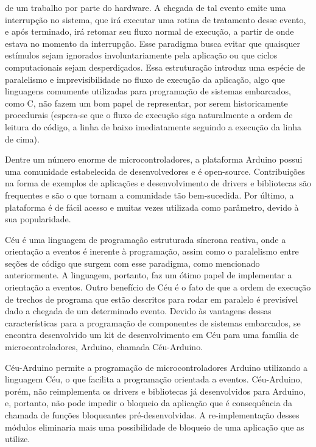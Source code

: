 \documentclass[11pt]{article}
\begin{document}
de um trabalho por parte do hardware. A chegada de tal evento emite uma interrupção no sistema, que
irá executar uma rotina de tratamento desse evento, e após terminado, irá retomar seu fluxo normal
de execução, a partir de onde estava no momento da interrupção. Esse paradigma busca evitar que
quaisquer estímulos sejam ignorados involuntariamente pela aplicação ou que ciclos computacionais
sejam desperdiçados. Essa estruturação introduz uma espécie de paralelismo e imprevisibilidade no
fluxo de execução da aplicação, algo que linguagens comumente utilizadas para programação de
sistemas embarcados, como C, não fazem um bom papel de representar, por serem historicamente
procedurais (espera-se que o fluxo de execução siga naturalmente a ordem de leitura do código, a
linha de baixo imediatamente seguindo a execução da linha de cima).
\par Dentre um número enorme de microcontroladores, a plataforma Arduino possui uma comunidade estabelecida de desenvolvedores e é open-source. Contribuições na forma de
exemplos de aplicações e desenvolvimento de drivers e bibliotecas são frequentes e são o que tornam
a comunidade tão bem-sucedida. Por último, a plataforma é de fácil acesso e muitas vezes utilizada
como parâmetro, devido à sua popularidade. \cite{arduinoblog}
\par Céu é uma linguagem de programação estruturada síncrona reativa, onde a orientação a eventos é
inerente à programação, assim como o paralelismo entre seções de código que surgem com esse
paradigma, como mencionado anteriormente. A linguagem, portanto, faz um ótimo papel de
implementar a orientação a eventos. Outro benefício de Céu é o fato de que a ordem de execução de
trechos de programa que estão descritos para rodar em paralelo é previsível dado a chegada de um
determinado evento.\cite{santanna2012} Devido às vantagens dessas características para a programação de
componentes de sistemas embarcados, se encontra desenvolvido um kit de desenvolvimento em Céu para
uma família de microcontroladores, Arduino, chamada Céu-Arduino.
\par Céu-Arduino permite a programação de microcontroladores Arduino utilizando a linguagem Céu, o
que facilita a programação orientada a eventos. Céu-Arduino, porém, não reimplementa os drivers e
bibliotecas já desenvolvidos para Arduino, e, portanto, não pode impedir o
bloqueio da aplicação que é consequência da chamada de funções bloqueantes pré-desenvolvidas. A
re-implementação desses módulos eliminaria mais uma possibilidade de bloqueio de uma aplicação
que as utilize.\cite{githubceuarduino}
\end{document}
